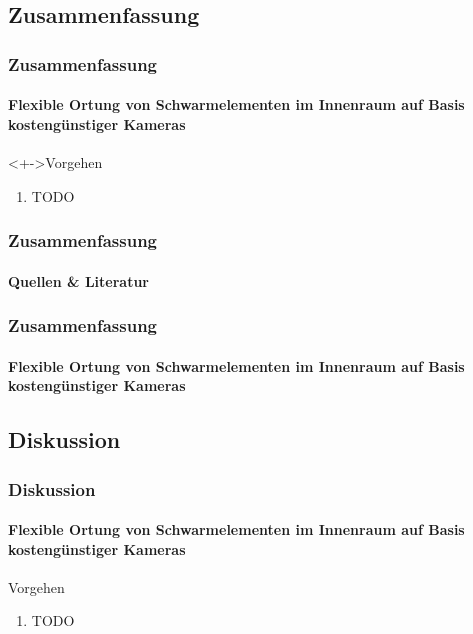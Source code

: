 \documentclass{beamer}
\begin{document}

\subsection{Zusammenfassung}


\begin{frame}
	\frametitle{Zusammenfassung}\framesubtitle{Flexible Ortung von Schwarmelementen im Innenraum auf Basis kosteng\"unstiger Kameras}
	\begin{block}<+->{Vorgehen}
		\begin{enumerate}
		  \item TODO
		\end{enumerate}
	\end{block}
\end{frame}


\begin{frame}
	\frametitle{Zusammenfassung}\framesubtitle{Quellen \& Literatur}
\end{frame}


\begin{frame}
	\frametitle{Zusammenfassung}\framesubtitle{Flexible Ortung von Schwarmelementen im Innenraum auf Basis kosteng\"unstiger Kameras}
	\vskip50pt
	\hskip50pt 
\end{frame}


\subsection{Diskussion}


\begin{frame}
	\frametitle{Diskussion}\framesubtitle{Flexible Ortung von Schwarmelementen im Innenraum auf Basis kosteng\"unstiger Kameras}
	\begin{block}{Vorgehen}
		\begin{enumerate}
		  \item TODO
		\end{enumerate}
	\end{block}
\end{frame}

\end{document}
